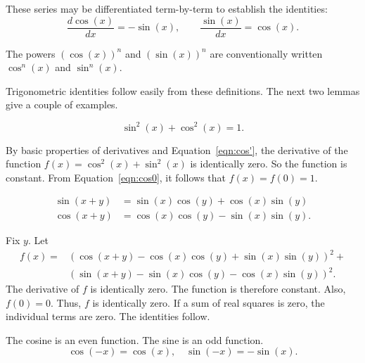 These series may be differentiated term-by-term to establish the identities:
    \begin{equation}\label{eqn:cos'}
    \frac{d \cos(x)}{dx} = -\sin(x),\qquad \frac{ \sin(x)}{dx} = \cos(x).
    \end{equation}

The powers $(\cos(x))^n$ and $(\sin(x))^n$ are conventionally written
$\cos^n(x)$ and $\sin^n(x)$.

Trigonometric identities follow easily from these definitions.  The next two lemmas 
give a couple of examples.

\begin{lemma}\label{lemma:circle} 
   $$\sin^2(x) + \cos^2(x) = 1.$$
\end{lemma}

\begin{proved}
By basic properties of derivatives and Equation~\ref{eqn:cos'},
the derivative of the function $f(x) = \cos^2(x) +\sin^2(x)$ is
identically zero.   So the function is constant.  From
Equation~\ref{eqn:cos0}, it follows that $f(x)=f(0)=1$.
\swallowed\end{proved}


\begin{lemma}\label{lemma:sin-add}
  $$\begin{array}{lll}
  \sin(x+y) &= \sin(x)\cos(y) + \cos(x)\sin(y)\\
  \cos(x+y)  &= \cos(x)\cos(y) - \sin(x)\sin(y).
  \end{array}$$
\end{lemma}

\begin{proved}
Fix $y$.  Let
    $$\begin{array}{lll}
    f(x) = &(\cos(x+y) - \cos(x)\cos(y) +
    \sin(x)\sin(y))^2 +\\ & (\sin(x+y) -\sin(x)\cos(y) -
    \cos(x)\sin(y))^2.
    \end{array}$$
The derivative of $f$ is identically zero.  The function is
therefore constant. Also, $f(0)=0$.  Thus, $f$ is identically zero.
If a sum of real squares is zero, the individual terms are zero. The
identities follow.
\swallowed\end{proved}

\begin{lemma}\label{lemma:cos-neg}
The cosine is an even function.  The sine is an odd
function.
    $$\cos(-x) = \cos(x),\quad\sin(-x) = -\sin(x).$$
\end{lemma}


